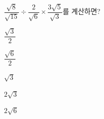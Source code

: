 $\dfrac{\sqrt{8}}{\sqrt{15}}\div\dfrac{2}{\sqrt{6}}\times\dfrac{3\sqrt{5}}{\sqrt{3}}$를 계산하면?
\begin{choices32}{\rule[-3ex]{0pt}{8ex}$\dfrac{\sqrt{3}}{2}$}{\rule[-3ex]{0pt}{8ex}$\dfrac{\sqrt{6}}{2}$}{\rule[-3ex]{0pt}{8ex}$\sqrt{3}$}{\rule[-3ex]{0pt}{8ex}$2\sqrt{3}$}{\rule[-3ex]{0pt}{8ex}$2\sqrt{6}$}\end{choices32}
